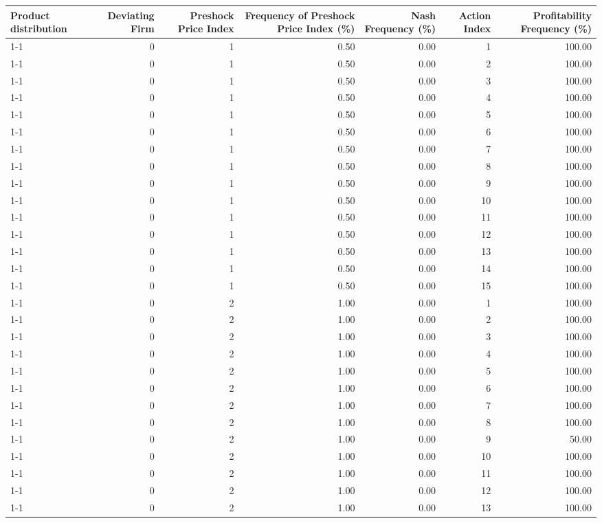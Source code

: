 \begin{tabular}{lrrrrrr}
\toprule
Product distribution & Deviating Firm & Preshock Price Index & Frequency of Preshock Price Index (\%) & Nash Frequency (\%) & Action Index & Profitability Frequency (\%) \\
\midrule
1-1 & 0 & 1 & 0.50 & 0.00 & 1 & 100.00 \\
1-1 & 0 & 1 & 0.50 & 0.00 & 2 & 100.00 \\
1-1 & 0 & 1 & 0.50 & 0.00 & 3 & 100.00 \\
1-1 & 0 & 1 & 0.50 & 0.00 & 4 & 100.00 \\
1-1 & 0 & 1 & 0.50 & 0.00 & 5 & 100.00 \\
1-1 & 0 & 1 & 0.50 & 0.00 & 6 & 100.00 \\
1-1 & 0 & 1 & 0.50 & 0.00 & 7 & 100.00 \\
1-1 & 0 & 1 & 0.50 & 0.00 & 8 & 100.00 \\
1-1 & 0 & 1 & 0.50 & 0.00 & 9 & 100.00 \\
1-1 & 0 & 1 & 0.50 & 0.00 & 10 & 100.00 \\
1-1 & 0 & 1 & 0.50 & 0.00 & 11 & 100.00 \\
1-1 & 0 & 1 & 0.50 & 0.00 & 12 & 100.00 \\
1-1 & 0 & 1 & 0.50 & 0.00 & 13 & 100.00 \\
1-1 & 0 & 1 & 0.50 & 0.00 & 14 & 100.00 \\
1-1 & 0 & 1 & 0.50 & 0.00 & 15 & 100.00 \\
1-1 & 0 & 2 & 1.00 & 0.00 & 1 & 100.00 \\
1-1 & 0 & 2 & 1.00 & 0.00 & 2 & 100.00 \\
1-1 & 0 & 2 & 1.00 & 0.00 & 3 & 100.00 \\
1-1 & 0 & 2 & 1.00 & 0.00 & 4 & 100.00 \\
1-1 & 0 & 2 & 1.00 & 0.00 & 5 & 100.00 \\
1-1 & 0 & 2 & 1.00 & 0.00 & 6 & 100.00 \\
1-1 & 0 & 2 & 1.00 & 0.00 & 7 & 100.00 \\
1-1 & 0 & 2 & 1.00 & 0.00 & 8 & 100.00 \\
1-1 & 0 & 2 & 1.00 & 0.00 & 9 & 50.00 \\
1-1 & 0 & 2 & 1.00 & 0.00 & 10 & 100.00 \\
1-1 & 0 & 2 & 1.00 & 0.00 & 11 & 100.00 \\
1-1 & 0 & 2 & 1.00 & 0.00 & 12 & 100.00 \\
1-1 & 0 & 2 & 1.00 & 0.00 & 13 & 100.00 \\

\end{tabular}
